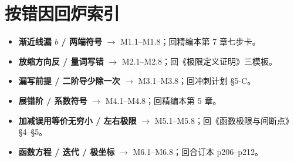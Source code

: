 \documentclass[11pt,a4paper]{ctexart}
\begin{document}
\section{按错因回炉索引}
\begin{itemize}\itemsep2pt
\item \textbf{渐近线漏 $b$ / 两端符号} $\to$ M1.1--M1.8；回精编本第 7 章七步卡。
\item \textbf{放缩方向反 / 量词写错} $\to$ M2.1--M2.8；回《极限定义证明》三模板。
\item \textbf{漏写前提 / 二阶导少除一次} $\to$ M3.1--M3.8；回冲刺计划 §5-C。
\item \textbf{展错阶 / 系数符号} $\to$ M4.1--M4.8；回精编本第 5 章。
\item \textbf{加减误用等价无穷小 / 左右极限} $\to$ M5.1--M5.8；回《函数极限与间断点》§4--§5。
\item \textbf{函数方程 / 迭代 / 极坐标} $\to$ M6.1--M6.8；回合订本 p206--p212。
\end{itemize}
\vfill
{}
\end{document}
